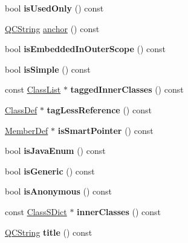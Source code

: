\begin{DoxyCompactItemize}
bool {\bfseries is\+Used\+Only} () const
\item 
\mbox{\hyperlink{class_q_c_string}{Q\+C\+String}} \mbox{\hyperlink{class_class_def_af865817aabca93db5792b247ca8dfba6}{anchor}} () const
\item 
\mbox{\label{class_class_def_aae3582cc7c6d4c09d84b25078c24f24a}} 
bool {\bfseries is\+Embedded\+In\+Outer\+Scope} () const
\item 
\mbox{\label{class_class_def_ad6a45b2b170323696202654fdb7c9630}} 
bool {\bfseries is\+Simple} () const
\item 
\mbox{\label{class_class_def_af275b886fda8057d4bad8cada264b628}} 
const \mbox{\hyperlink{class_class_list}{Class\+List}} $\ast$ {\bfseries tagged\+Inner\+Classes} () const
\item 
\mbox{\label{class_class_def_ac5e042ec1f1bbe2fb032452d8363bde6}} 
\mbox{\hyperlink{class_class_def}{Class\+Def}} $\ast$ {\bfseries tag\+Less\+Reference} () const
\item 
\mbox{\label{class_class_def_add85dc2dba1bee7bca6cb2fb088e5211}} 
\mbox{\hyperlink{class_member_def}{Member\+Def}} $\ast$ {\bfseries is\+Smart\+Pointer} () const
\item 
\mbox{\label{class_class_def_a7da8f8cb5bb8946d66f8432e56795e73}} 
bool {\bfseries is\+Java\+Enum} () const
\item 
\mbox{\label{class_class_def_af86a301a3ba491bac8b61561a8b14acc}} 
bool {\bfseries is\+Generic} () const
\item 
\mbox{\label{class_class_def_a2bfc4ccfe51340043513dfbae5645147}} 
bool {\bfseries is\+Anonymous} () const
\item 
\mbox{\label{class_class_def_a0eb1ceef7e1330e586eb6056781d0f3d}} 
const \mbox{\hyperlink{class_class_s_dict}{Class\+S\+Dict}} $\ast$ {\bfseries inner\+Classes} () const
\item 
\mbox{\label{class_class_def_a6e390a0633414a107beb3d6a09fadc7e}} 
\mbox{\hyperlink{class_q_c_string}{Q\+C\+String}} {\bfseries title} () const

\end{DoxyCompactItemize}
